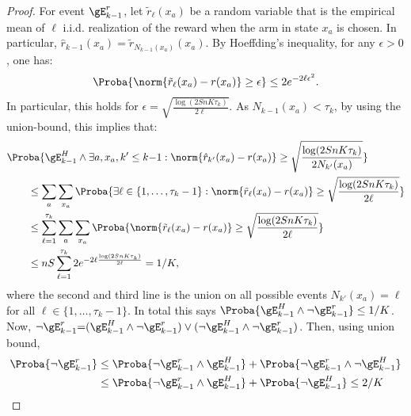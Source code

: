\begin{proof}
    For event $\gE_{k-1}^r$, let $\tilde{r}_\ell(x_a)$ be a random variable that is the empirical mean of $\ell$ i.i.d. realization of the reward when the arm in state $x_a$ is chosen. In particular, ${\hat{r}_{k-1}(x_a) = \tilde{r}_{N_{k{-}1}(x_a)}(x_a)}$. By Hoeffding's inequality, for any $\epsilon>0$, one has:
    \begin{align*}
        \Proba{\norm{\tilde{r}_\ell(x_a) - r(x_a)} \ge \epsilon  } \le 2 e^{-2 \ell\epsilon^2}.
    \end{align*}
    In particular, this holds for $\epsilon=\sqrt{\frac{\log (2SnK\tau_k)}{2\ell}}$. As $N_{k-1}(x_a)< \tau_k$, by using the union-bound, this implies that: 
    \begin{align}
        &\Proba{\gE_{k-1}^H \land \exists a, x_a, k'\le k{-}1: \norm{\hat{r}_{k'}(x_a) - r(x_a)} \ge \sqrt{\frac{\log (2SnK\tau_k)}{2N_{k'}(x_a)}}}\label{eq:estR_k}\\
        &\qquad\le \sum_{a}\sum_{x_a}\Proba{\exists \ell\in\{1,\dots,\tau_k-1\}: \norm{\tilde{r}_{\ell}(x_a) - r(x_a)} \ge \sqrt{\frac{\log (2SnK\tau_k)}{2\ell}}}\nonumber\\
        &\qquad\le \sum_{\ell=1}^{\tau_k}\sum_a\sum_{x_a}\Proba{\norm{\tilde{r}_{\ell}(x_a) - r(x_a)} \ge \sqrt{\frac{\log (2SnK\tau_k)}{2\ell}}}\nonumber\\
        &\qquad\le  n S \sum_{\ell=1}^{\tau_k} 2e^{-2 \ell \frac{\log (2SnK\tau_k)}{2\ell}} =1/K,\nonumber
    \end{align}
    where the second and third  line is the union on all possible events $N_{k'}(x_a){=}\ell$ for all ${\ell{\in}\{1,\dots, \tau_k-1\}}$.
    In total this says $\Proba{\gE_{k-1}^H\land \lnot \gE_{k-1}^r}\le 1/K$.
    Now, $\lnot \gE_{k-1}^r {=}(\gE_{k-1}^H \land \lnot \gE_{k-1}^r) \lor (\lnot \gE_{k-1}^H \land \lnot \gE_{k-1}^r)$.
    Then, using union bound,
    \begin{align*}
        \Proba{\lnot \gE_{k-1}^r}
        &\le \Proba{\lnot \gE_{k-1}^r \land \gE_{k-1}^H} + \Proba{\lnot \gE_{k-1}^r \land \lnot \gE_{k-1}^H} \\
        &\le \Proba{\lnot \gE_{k-1}^r \land \gE_{k-1}^H} + \Proba{\lnot \gE_{k-1}^H} \le 2/K
    \end{align*}


\end{proof}
